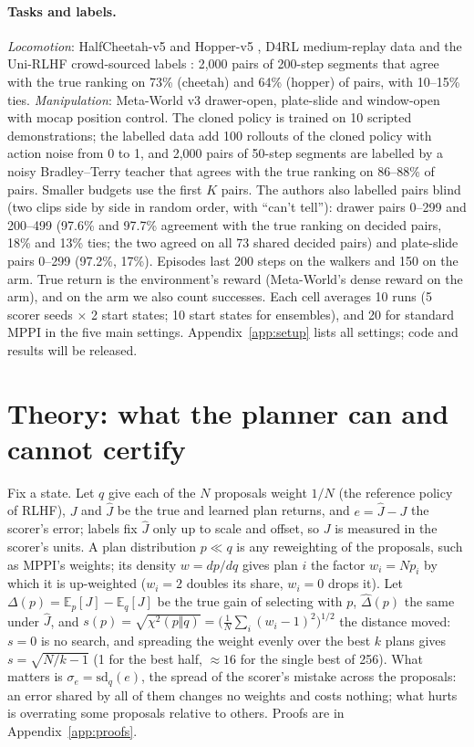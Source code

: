 \documentclass{article}
\theoremstyle{plain}
\theoremstyle{remark}
\newcommand{\E}{\mathbb{E}}
\newcommand{\Jh}{\hat{J}}
\begin{document}
\paragraph{Tasks and labels.} \emph{Locomotion}: HalfCheetah-v5 and Hopper-v5 \citep{towers2024gymnasium}, D4RL
medium-replay data \citep{fu2020d4rl} and the Uni-RLHF crowd-sourced labels \citep{yuan2024unirlhf}: 2,000 pairs of
200-step segments that agree with the true ranking on 73\% (cheetah) and 64\% (hopper) of pairs, with 10--15\% ties.
\emph{Manipulation}: Meta-World v3 drawer-open, plate-slide and window-open \citep{yu2020metaworld} with mocap position control.
The cloned policy is trained on 10 scripted demonstrations; the labelled data add 100 rollouts of the cloned policy
with action noise from 0 to 1, and 2,000 pairs of 50-step segments are labelled by a noisy Bradley--Terry teacher that
agrees with the true ranking on 86--88\% of pairs. Smaller budgets use the first $K$ pairs. The authors also labelled
pairs blind (two clips side by side in random order, with ``can't tell''): drawer pairs 0--299 and 200--499 (97.6\%
and 97.7\% agreement with the true ranking on decided pairs, 18\% and 13\% ties; the two agreed on all 73 shared
decided pairs) and plate-slide pairs 0--299 (97.2\%, 17\%). Episodes last 200 steps on
the walkers and 150 on the arm. True return is the environment's reward (Meta-World's dense reward on the arm), and on
the arm we also count successes. Each cell averages 10 runs (5 scorer seeds $\times$ 2 start states; 10 start states for
ensembles), and 20 for standard MPPI in the five main settings. Appendix~\ref{app:setup} lists all settings; code and results will be released.

\section{Theory: what the planner can and cannot certify}
\label{sec:theory}

Fix a state. Let $q$ give each of the $N$ proposals weight $1/N$ (the reference policy of RLHF), $J$ and $\Jh$ be the
true and learned plan returns, and $e=\Jh-J$ the scorer's error; labels fix $\Jh$ only up to scale and offset, so $J$
is measured in the scorer's units. A plan distribution $p\ll q$ is any reweighting of the proposals, such as MPPI's
weights; its density $w=dp/dq$ gives plan $i$ the factor $w_i=Np_i$ by which it is up-weighted ($w_i=2$ doubles its
share, $w_i=0$ drops it). Let $\Delta(p)=\E_p[J]-\E_q[J]$ be the true gain of selecting with $p$, $\hat\Delta(p)$ the
same under $\Jh$, and $s(p)=\sqrt{\chi^2(p\Vert q)}=\big(\tfrac1N\sum_i(w_i-1)^2\big)^{1/2}$ the distance moved: $s=0$
is no search, and spreading the weight evenly over the best $k$ plans gives $s=\sqrt{N/k-1}$ (1 for the best half,
$\approx16$ for the single best of 256). What matters is $\sigma_e=\mathrm{sd}_q(e)$, the spread of the scorer's mistake
across the proposals: an error shared by all of them changes no weights and costs nothing; what hurts is overrating
some proposals relative to others. Proofs are in Appendix~\ref{app:proofs}.
\end{document}
